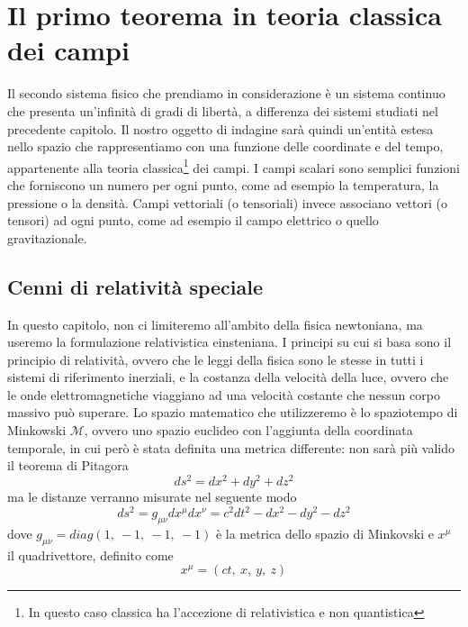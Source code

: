 \chapter{Il primo teorema in teoria classica dei campi}

    Il secondo sistema fisico che prendiamo in considerazione è un sistema continuo che presenta un'infinità di gradi di libertà, a differenza dei sistemi studiati nel precedente capitolo. Il nostro oggetto di indagine sarà quindi un'entità estesa nello spazio che rappresentiamo con una funzione delle coordinate e del tempo, appartenente alla teoria classica\footnote{In questo caso classica ha l'accezione di relativistica e non quantistica} dei campi. I campi scalari sono semplici funzioni che forniscono un numero per ogni punto, come ad esempio la temperatura, la pressione o la densità. Campi vettoriali (o tensoriali) invece associano vettori (o tensori) ad ogni punto, come ad esempio il campo elettrico o quello gravitazionale.

\section{Cenni di relatività speciale}
    In questo capitolo, non ci limiteremo all'ambito della fisica newtoniana, ma useremo la formulazione relativistica einsteniana. I principi su cui si basa sono il principio di relatività, ovvero che le leggi della fisica sono le stesse in tutti i sistemi di riferimento inerziali, e la costanza della velocità della luce, ovvero che le onde elettromagnetiche viaggiano ad una velocità costante che nessun corpo massivo può superare. Lo spazio matematico che utilizzeremo è lo spaziotempo di Minkowski $\mathcal M$, ovvero uno spazio euclideo con l'aggiunta della coordinata temporale, in cui però è stata definita una metrica differente: non sarà più valido il teorema di Pitagora 
    \begin{equation*}
        ds^2 = dx^2 + dy^2 + dz^2
    \end{equation*}
    ma le distanze verranno misurate nel seguente modo
    \begin{equation*}
        ds^2 = g_{\mu\nu} dx^\mu dx^\nu = c^2 dt^2 - dx^2 - dy^2 - dz^2
    \end{equation*}
    dove $g_{\mu\nu} = diag(1,~-1,~-1,~-1)$ è la metrica dello spazio di Minkovski e $x^\mu$ il quadrivettore, definito come 
    \begin{equation*}
        x^\mu = (ct,~x,~y,~z)
    \end{equation*}
    
